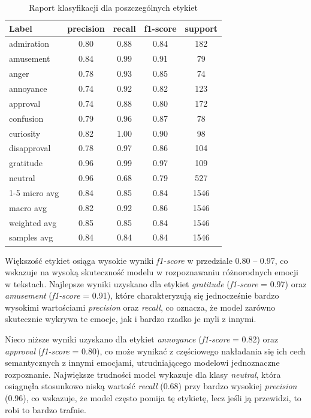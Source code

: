 \documentclass[wmii, inf, mgr]{uwmthesis}
\begin{document}
\begin{table}[H]
	\centering
	\renewcommand{\arraystretch}{1.6}
	{\normalsize
		\begin{tabular}{|l|c|c|c|c|}
			\hline
			\textbf{Label} & \textbf{precision} & \textbf{recall} & \textbf{f1-score} & \textbf{support} \\ \hline
			admiration & 0.80 & 0.88 & 0.84 & 182 \\ \hline
			amusement & 0.84 & 0.99 & 0.91 & 79 \\ \hline
			anger & 0.78 & 0.93 & 0.85 & 74 \\ \hline
			annoyance & 0.74 & 0.92 & 0.82 & 123 \\ \hline
			approval & 0.74 & 0.88 & 0.80 & 172 \\ \hline
			confusion & 0.79 & 0.96 & 0.87 & 78 \\ \hline
			curiosity & 0.82 & 1.00 & 0.90 & 98 \\ \hline
			disapproval & 0.78 & 0.97 & 0.86 & 104 \\ \hline
			gratitude & 0.96 & 0.99 & 0.97 & 109 \\ \hline
			neutral & 0.96 & 0.68 & 0.79 & 527 \\ \hline
			\cline{1-5}
			micro avg & 0.84 & 0.85 & 0.84 & 1546 \\ \hline
			macro avg & 0.82 & 0.92 & 0.86 & 1546 \\ \hline
			weighted avg & 0.85 & 0.85 & 0.84 & 1546 \\ \hline
			samples avg & 0.84 & 0.84 & 0.84 & 1546 \\ \hline
		\end{tabular}
	}
	\caption{Raport klasyfikacji dla poszczególnych etykiet}
	\label{tab:raport}
\end{table}

Większość etykiet osiąga wysokie wyniki \textit{f1-score} w przedziale 0.80 -- 0.97, co wskazuje na wysoką skuteczność modelu w rozpoznawaniu różnorodnych emocji w tekstach. Najlepsze wyniki uzyskano dla etykiet \textit{gratitude} (\textit{f1-score} = 0.97) oraz \textit{amusement} (\textit{f1-score} = 0.91), które charakteryzują się jednocześnie bardzo wysokimi wartościami \textit{precision} oraz \textit{recall}, co oznacza, że model zarówno skutecznie wykrywa te emocje, jak i bardzo rzadko je myli z innymi. 

Nieco niższe wyniki uzyskano dla etykiet \textit{annoyance} (\textit{f1-score} = 0.82) oraz \textit{approval} (\textit{f1-score} = 0.80), co może wynikać z częściowego nakładania się ich cech semantycznych z innymi emocjami, utrudniającego modelowi jednoznaczne rozpoznanie. Największe trudności model wykazuje dla klasy \textit{neutral}, która osiągnęła stosunkowo niską wartość \textit{recall} (0.68) przy bardzo wysokiej \textit{precision} (0.96), co wskazuje, że model często pomija tę etykietę, lecz jeśli ją przewidzi, to robi to bardzo trafnie. 
\end{document}

